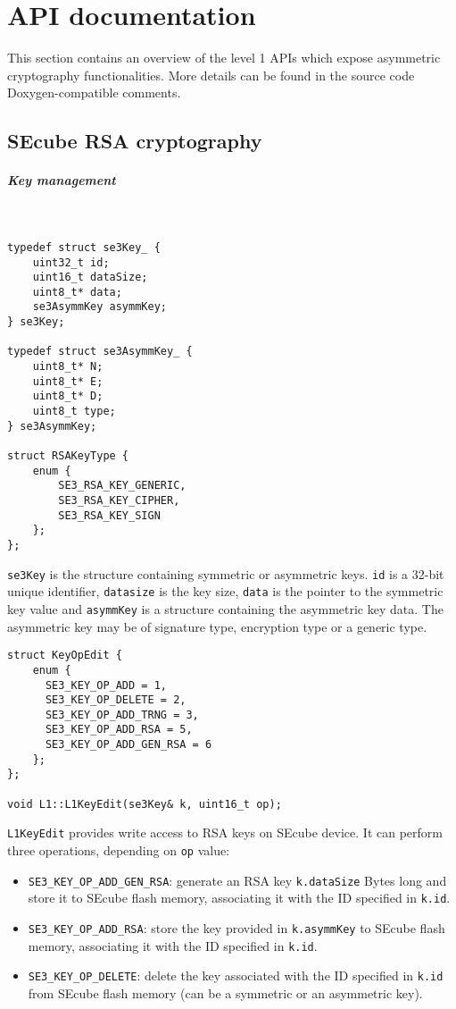 \chapter{API documentation}
This section contains an overview of the level 1 APIs which expose asymmetric
cryptography functionalities. More details can be found in the source code
Doxygen-compatible comments.

\section{SEcube RSA cryptography}
\paragraph{Key management} \hspace{0pt} \\
\begin{lstlisting}
typedef struct se3Key_ {
	uint32_t id;
	uint16_t dataSize;
	uint8_t* data;
	se3AsymmKey asymmKey;
} se3Key;

typedef struct se3AsymmKey_ {
	uint8_t* N;
	uint8_t* E;
	uint8_t* D;
	uint8_t type;
} se3AsymmKey;

struct RSAKeyType {
	enum {
		SE3_RSA_KEY_GENERIC,
		SE3_RSA_KEY_CIPHER,
		SE3_RSA_KEY_SIGN
	};
};
\end{lstlisting}

\texttt{se3Key} is the structure containing symmetric or asymmetric keys.
\texttt{id} is a 32-bit unique identifier, \texttt{datasize} is the key size,
\texttt{data} is the pointer to the symmetric key value and \texttt{asymmKey}
is a structure containing the asymmetric key data.
The asymmetric key may be of signature type, encryption type or a generic type.

\begin{lstlisting}
struct KeyOpEdit {
	enum {
	  SE3_KEY_OP_ADD = 1,
	  SE3_KEY_OP_DELETE = 2,
	  SE3_KEY_OP_ADD_TRNG = 3,
	  SE3_KEY_OP_ADD_RSA = 5,
	  SE3_KEY_OP_ADD_GEN_RSA = 6
	};
};

void L1::L1KeyEdit(se3Key& k, uint16_t op);
\end{lstlisting}

\texttt{L1KeyEdit} provides write access to RSA keys on SEcube device.
It can perform three operations, depending on \texttt{op} value:
\begin{itemize}
	\item \texttt{SE3\_KEY\_OP\_ADD\_GEN\_RSA}: generate an RSA key \texttt{k.dataSize} Bytes long and store
	    it to SEcube flash memory, associating it with the ID specified in
		\texttt{k.id}.
    \item \texttt{SE3\_KEY\_OP\_ADD\_RSA}: store the key provided in
	    \texttt{k.asymmKey} to SEcube flash memory, associating it with the
		ID specified in \texttt{k.id}.
    \item \texttt{SE3\_KEY\_OP\_DELETE}: delete the key associated with the ID
	    specified in \texttt{k.id} from SEcube flash memory (can be a
		symmetric or an asymmetric key).
\end{itemize}

